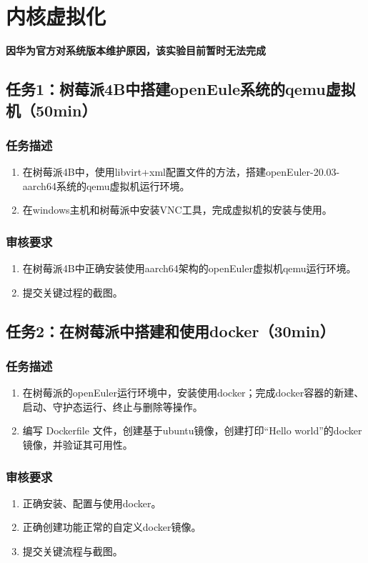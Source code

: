 \documentclass{article}
\begin{document}
\newpage

\section{内核虚拟化}
\textbf{因华为官方对系统版本维护原因，该实验目前暂时无法完成}

\subsection{任务1：树莓派4B中搭建openEule系统的qemu虚拟机（50min）}
\subsubsection{任务描述}
\begin{enumerate}
	\item 在树莓派4B中，使用libvirt+xml配置文件的方法，搭建openEuler-20.03-aarch64系统的qemu虚拟机运行环境。
	\item 在windows主机和树莓派中安装VNC工具，完成虚拟机的安装与使用。
\end{enumerate}

\subsubsection{审核要求}
\begin{enumerate}
	\item 在树莓派4B中正确安装使用aarch64架构的openEuler虚拟机qemu运行环境。
	\item 提交关键过程的截图。
\end{enumerate}
\subsection{任务2：在树莓派中搭建和使用docker（30min）}

\subsubsection{任务描述}
\begin{enumerate}
	\item 在树莓派的openEuler运行环境中，安装使用docker；完成docker容器的新建、启动、守护态运行、终止与删除等操作。
	\item 编写 Dockerfile 文件，创建基于ubuntu镜像，创建打印“Hello world”的docker镜像，并验证其可用性。

\end{enumerate}

\subsubsection{审核要求}
\begin{enumerate}
	\item 正确安装、配置与使用docker。
	\item 正确创建功能正常的自定义docker镜像。
	\item 提交关键流程与截图。
\end{enumerate}
\end{document}
